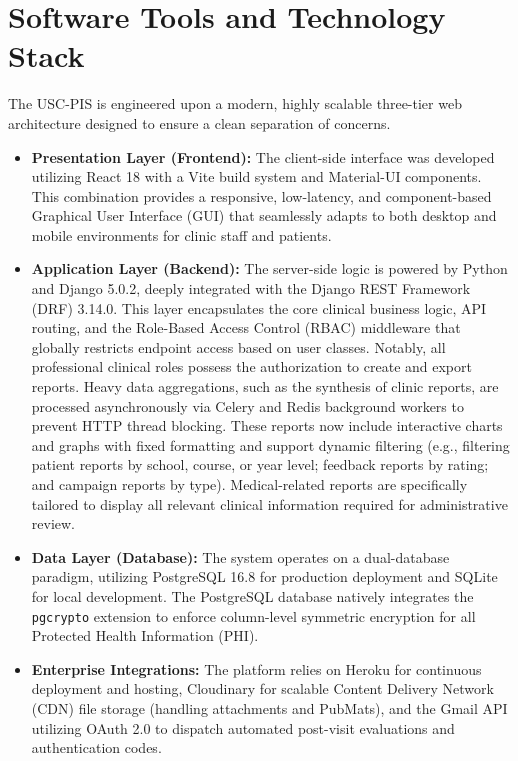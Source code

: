 \section{Software Tools and Technology Stack}
The USC-PIS is engineered upon a modern, highly scalable three-tier web architecture designed to ensure a clean separation of concerns.

\begin{itemize}
    \item \textbf{Presentation Layer (Frontend):} The client-side interface was developed utilizing React 18 with a Vite build system and Material-UI components. This combination provides a responsive, low-latency, and component-based Graphical User Interface (GUI) that seamlessly adapts to both desktop and mobile environments for clinic staff and patients.
    \item \textbf{Application Layer (Backend):} The server-side logic is powered by Python and Django 5.0.2, deeply integrated with the Django REST Framework (DRF) 3.14.0. This layer encapsulates the core clinical business logic, API routing, and the Role-Based Access Control (RBAC) middleware that globally restricts endpoint access based on user classes. Notably, all professional clinical roles possess the authorization to create and export reports. Heavy data aggregations, such as the synthesis of clinic reports, are processed asynchronously via Celery and Redis background workers to prevent HTTP thread blocking. These reports now include interactive charts and graphs with fixed formatting and support dynamic filtering (e.g., filtering patient reports by school, course, or year level; feedback reports by rating; and campaign reports by type). Medical-related reports are specifically tailored to display all relevant clinical information required for administrative review.
    \item \textbf{Data Layer (Database):} The system operates on a dual-database paradigm, utilizing PostgreSQL 16.8 for production deployment and SQLite for local development. The PostgreSQL database natively integrates the \texttt{pgcrypto} extension to enforce column-level symmetric encryption for all Protected Health Information (PHI).
    \item \textbf{Enterprise Integrations:} The platform relies on Heroku for continuous deployment and hosting, Cloudinary for scalable Content Delivery Network (CDN) file storage (handling attachments and PubMats), and the Gmail API utilizing OAuth 2.0 to dispatch automated post-visit evaluations and authentication codes.
\end{itemize}

